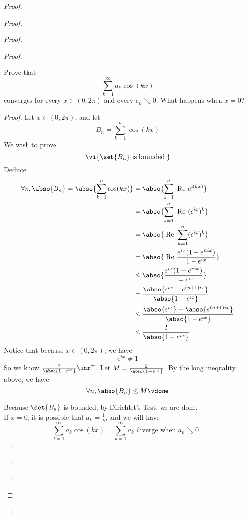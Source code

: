 \documentclass{report}
\begin{document}
\begin{proof}
\begin{proof}
\begin{proof}
\begin{proof}
\begin{question}{}{}
Prove that 
\[
\sum_{k=1}^{\infty} a_k \cos(kx)
\]
converges for every \( x \in (0, 2\pi) \) and every \( a_k \searrow 0 \). What happens when \( x = 0 \)?
\end{question}
\begin{proof}
Let $x\in (0,2\pi)$, and let 
\begin{equation}
B_n=\sum_{k=1}^n \cos(kx)
\end{equation}
We wish to prove
\begin{equation}
\vi{\set{B_n}\text{ is bounded }}
\end{equation}
Deduce
\begin{align}
  \forall n,\abso{B_n}=\abso{\sum_{k=1}^n \cos (kx)}&= \abso{\sum_{k=1}^n \text{ Re }e^{i(kx)}}\\
  &=\abso{\sum_{k=1}^n \text{ Re }(e^{ix})^k}\\
  &=\abso{\text{ Re }\sum_{k=1}^n (e^{ix})^k}\\
  &=\abso{\text{ Re }\frac{e^{ix}(1-e^{nix})}{1-e^{ix}}}\\
  &\leq \abso{\frac{e^{ix}(1-e^{nix})}{1-e^{ix}}}\\
  &=\frac{\abso{e^{ix}-e^{(n+1)ix}}}{\abso{1-e^{ix}}}\\
  &\leq \frac{\abso{e^{ix}}+\abso{e^{(n+1)ix}}}{\abso{1-e^{ix}}}\\
  &\leq \frac{2}{\abso{1-e^{ix}}}
\end{align}
Notice that because $x\in (0,2\pi)$, we have
\begin{equation}
e^{ix}\neq 1
\end{equation}
So we know $\frac{2}{\abso{1-e^{ix}}}\inr^+$. Let $M=\frac{2}{\abso{1-e^{ix}}}$. By the long inequality above, we have
\begin{equation}
\forall n, \abso{B_n}\leq M\vdone
\end{equation}

Because $\set{B_n}$ is bounded, by Dirichlet's Test, we are done.\\

If $x=0$, it is possible that  $a_k=\frac{1}{k}$, and we will have
\begin{equation}
\sum_{k=1}^\infty a_k\cos(kx)=\sum_{k=1}^\infty a_k\text{ diverge when $a_k\searrow 0$ }
\end{equation}
\end{proof}


\end{proof}
\end{proof}
\end{proof}
\end{proof}
\end{document}

